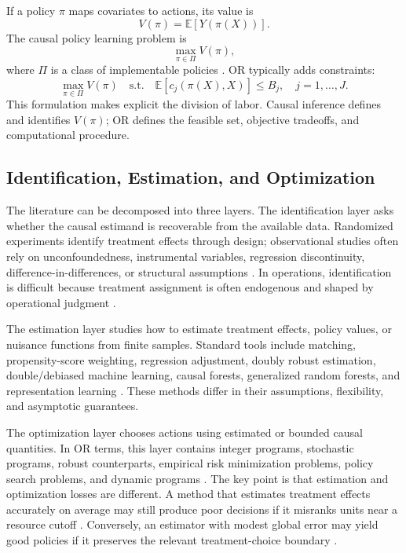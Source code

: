 \documentclass[11pt]{article}
\begin{document}
If a policy $\pi$ maps covariates to actions, its value is
\[
    V(\pi)=\mathbb{E}[Y(\pi(X))].
\]
The causal policy learning problem is
\[
    \max_{\pi\in\Pi} V(\pi),
\]
where $\Pi$ is a class of implementable policies \citep{manski2004statistical,kitagawa2018treated,athey2021policy}. OR typically adds constraints:
\[
    \max_{\pi\in\Pi} V(\pi)
    \quad\text{s.t.}\quad
    \mathbb{E}[c_j(\pi(X),X)]\le B_j,\quad j=1,\ldots,J.
\]
This formulation makes explicit the division of labor. Causal inference defines and identifies $V(\pi)$; OR defines the feasible set, objective tradeoffs, and computational procedure.

\subsection{Identification, Estimation, and Optimization}

The literature can be decomposed into three layers. The identification layer asks whether the causal estimand is recoverable from the available data. Randomized experiments identify treatment effects through design; observational studies often rely on unconfoundedness, instrumental variables, regression discontinuity, difference-in-differences, or structural assumptions \citep{rosenbaum1983central,angrist2009mostly,imbens2015causal,hernan2020causal}. In operations, identification is difficult because treatment assignment is often endogenous and shaped by operational judgment \citep{ho2017causal}.

The estimation layer studies how to estimate treatment effects, policy values, or nuisance functions from finite samples. Standard tools include matching, propensity-score weighting, regression adjustment, doubly robust estimation, double/debiased machine learning, causal forests, generalized random forests, and representation learning \citep{rosenbaum1983central,chernozhukov2018dml,wager2018causalforest,athey2019grf,shalit2017estimating}. These methods differ in their assumptions, flexibility, and asymptotic guarantees.

The optimization layer chooses actions using estimated or bounded causal quantities. In OR terms, this layer contains integer programs, stochastic programs, robust counterparts, empirical risk minimization problems, policy search problems, and dynamic programs \citep{bertsimas1997introduction,kitagawa2018treated,bertsimas2020predictive,ben2009robust,murphy2003dynamic}. The key point is that estimation and optimization losses are different. A method that estimates treatment effects accurately on average may still produce poor decisions if it misranks units near a resource cutoff \citep{fernandez2022causal,athey2021policy}. Conversely, an estimator with modest global error may yield good policies if it preserves the relevant treatment-choice boundary \citep{kitagawa2018treated}.
\end{document}
